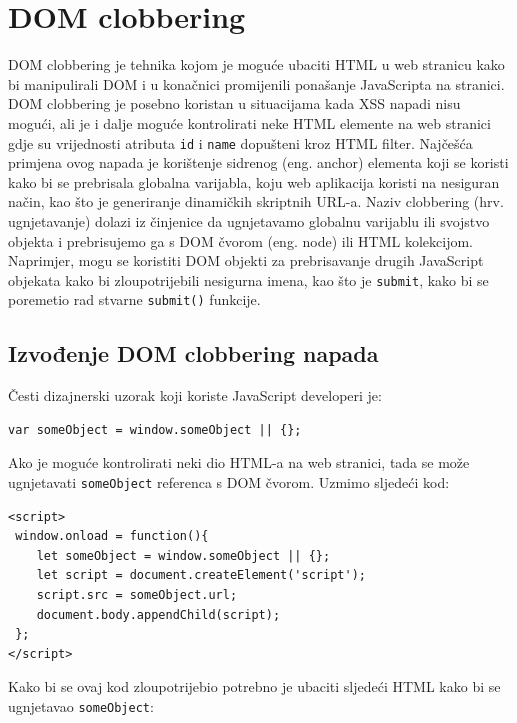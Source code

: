 \documentclass[12pt, oneside, onecolumn]{book}
\begin{document}
{\section{DOM clobbering}
DOM clobbering je tehnika kojom je moguće ubaciti HTML u web stranicu kako bi manipulirali DOM i u konačnici promijenili ponašanje JavaScripta na stranici. DOM clobbering je posebno koristan u situacijama kada XSS napadi nisu mogući, ali je i dalje moguće kontrolirati neke HTML elemente na web stranici gdje su vrijednosti atributa \texttt{id} i \texttt{name} dopušteni kroz HTML filter. Najčešća primjena ovog napada je korištenje sidrenog (eng. anchor) elementa koji se koristi kako bi se prebrisala globalna varijabla, koju web aplikacija koristi na nesiguran način, kao što je generiranje dinamičkih skriptnih URL-a. Naziv clobbering (hrv. ugnjetavanje) dolazi iz činjenice da ugnjetavamo globalnu varijablu ili svojstvo objekta i prebrisujemo ga s DOM čvorom (eng. node) ili HTML kolekcijom. Naprimjer, mogu se koristiti DOM objekti za prebrisavanje drugih JavaScript objekata kako bi zloupotrijebili nesigurna imena, kao što je \texttt{submit}, kako bi se poremetio rad stvarne \texttt{submit()} funkcije.

\subsection{Izvođenje DOM clobbering napada}

Česti dizajnerski uzorak koji koriste JavaScript developeri je:

\begin{verbatim}
var someObject = window.someObject || {}; 
\end{verbatim}

Ako je moguće kontrolirati neki dio HTML-a na web stranici, tada se može ugnjetavati \texttt{someObject} referenca s DOM čvorom. Uzmimo sljedeći kod:

\begin{verbatim}
<script>
 window.onload = function(){
    let someObject = window.someObject || {};
    let script = document.createElement('script');
    script.src = someObject.url;
    document.body.appendChild(script);
 };
</script>
\end{verbatim}

Kako bi se ovaj kod zloupotrijebio potrebno je ubaciti sljedeći HTML kako bi se ugnjetavao \texttt{someObject}:

\begin{verbatim}


\end{verbatim}}
\end{document}

